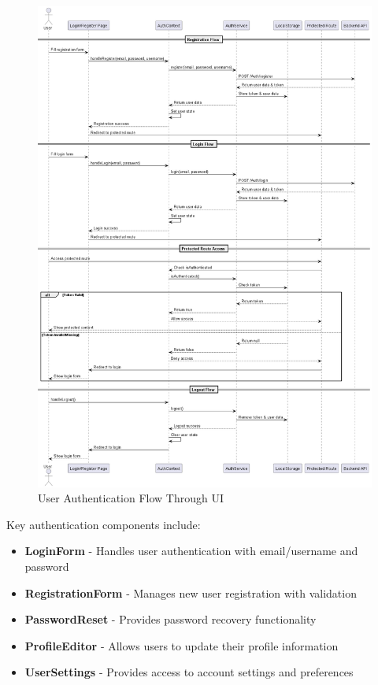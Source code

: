 \begin{figure}[p]
    \centering
    \includegraphics[width=\textwidth]{./Chapter07/figures/authentication_ui_flow.png}
    \caption{User Authentication Flow Through UI}
    \label{fig:authentication-ui-flow}
\end{figure}
\clearpage

Key authentication components include:

\begin{itemize}
  \item \textbf{LoginForm} - Handles user authentication with email/username and password
  \item \textbf{RegistrationForm} - Manages new user registration with validation
  \item \textbf{PasswordReset} - Provides password recovery functionality
  \item \textbf{ProfileEditor} - Allows users to update their profile information
  \item \textbf{UserSettings} - Provides access to account settings and preferences
\end{itemize}

